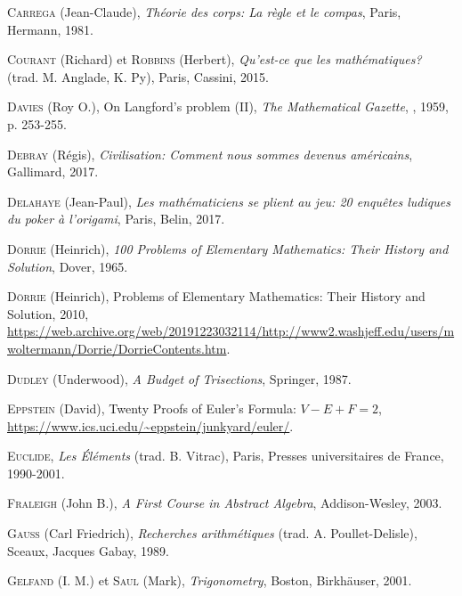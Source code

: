 \begin{thebibliography}{99}
\textsc{Carrega} (Jean-Claude), \emph{Théorie des corps: La règle et le compas}, Paris, Hermann, 1981.

  \textsc{Courant} (Richard) et \textsc{Robbins} (Herbert), \emph{Qu'est-ce que les mathématiques?} (trad. M. Anglade, K. Py), Paris, Cassini, 2015.


  \textsc{Davies} (Roy O.), \og On {Langford's} problem {(II)}\fg, \emph{The Mathematical Gazette}, , 1959, p. 253-255.

\textsc{Debray} (Régis), \emph{Civilisation: Comment nous sommes devenus américains}, Gallimard, 2017.

\textsc{Delahaye} (Jean-Paul), \emph{Les mathématiciens se plient au jeu: 20 enquêtes ludiques du poker à l'origami}, Paris, Belin, 2017. 

  \textsc{D\"{o}rrie} (Heinrich), \emph{100 Problems of Elementary Mathematics: Their History and Solution}, Dover, 1965.


  \textsc{D\"{o}rrie} (Heinrich),  Problems of Elementary Mathematics: Their History and Solution\fg, 2010, \url{https://web.archive.org/web/20191223032114/http://www2.washjeff.edu/users/mwoltermann/Dorrie/DorrieContents.htm}.


  \textsc{Dudley} (Underwood), \emph{A Budget of Trisections}, Springer, 1987.




  \textsc{Eppstein} (David), \og Twenty Proofs of {Euler's} Formula: {$V-E+F=2$}\fg, \url{https://www.ics.uci.edu/~eppstein/junkyard/euler/}.

\textsc{Euclide}, \emph{Les \'Eléments} (trad. B. Vitrac),  Paris, Presses universitaires de France, 1990-2001.


  \textsc{Fraleigh} (John B.), \emph{A First Course in Abstract Algebra}, Addison-Wesley, 2003.

  \textsc{Gauss} (Carl Friedrich), \emph{Recherches arithmétiques} (trad. A. Poullet-Delisle), Sceaux, Jacques Gabay, 1989.


 
  \textsc{Gelfand} (I. M.) et \textsc{Saul} (Mark), \emph{Trigonometry}, Boston, Birkhäuser, 2001.


\end{thebibliography}
